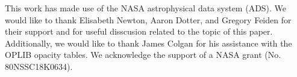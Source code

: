 \documentclass[twocolumn,linenumbers]{src/aastex631}
\begin{document}
\appendix



\begin{acknowledgments}
	This work has made use of the NASA astrophysical data system (ADS). We would
	like to thank Elisabeth Newton, Aaron Dotter, and Gregory Feiden for their
	support and for useful disscusion related to the topic of this paper.
	Additionally, we would like to thank James Colgan for his assistance with
	the OPLIB opacity tables. We acknowledge the support of a NASA grant (No.
	80NSSC18K0634). 
\end{acknowledgments}



{}

\end{document}
